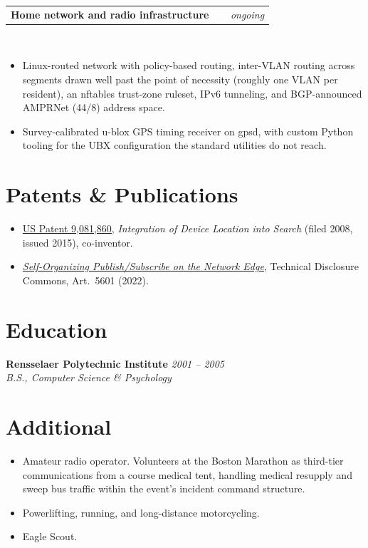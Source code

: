 \documentclass[10.5pt]{article}
\makeatletter
\newcommand{\role}[2]{%
  \noindent\begin{tabular*}{\linewidth}{@{}p{0.79\linewidth}@{\extracolsep{\fill}}r@{}}
  \textbf{#1} & \textit{#2}
  \end{tabular*}\\[0.5pt]
}
\makeatother
\begin{document}
\vspace{2pt}
\role{Home network and radio infrastructure}{ongoing}
\begin{itemize}
  \item Linux-routed network with policy-based routing, inter-VLAN routing across segments drawn well past the point of necessity (roughly one VLAN per resident), an nftables trust-zone ruleset, IPv6 tunneling, and BGP-announced AMPRNet (44/8) address space.
  \item Survey-calibrated u-blox GPS timing receiver on gpsd, with custom Python tooling for the UBX configuration the standard utilities do not reach.
\end{itemize}

\section*{Patents \& Publications}
\begin{itemize}
  \item \href{https://patents.google.com/patent/US9081860B2/en}{US Patent 9,081,860}, \emph{Integration of Device Location into Search} (filed 2008, issued 2015), co-inventor.
  \item \href{https://www.tdcommons.org/dpubs_series/5601}{\emph{Self-Organizing Publish/Subscribe on the Network Edge}}, Technical Disclosure Commons, Art.~5601 (2022).
\end{itemize}

\section*{Education}
\textbf{Rensselaer Polytechnic Institute} \hfill \textit{2001 -- 2005}\\
\textit{\small B.S., Computer Science \& Psychology}

\section*{Additional}
\begin{itemize}
  \item Amateur radio operator. Volunteers at the Boston Marathon as third-tier communications from a course medical tent, handling medical resupply and sweep bus traffic within the event's incident command structure.
  \item Powerlifting, running, and long-distance motorcycling.
  \item Eagle Scout.
\end{itemize}
\end{document}
